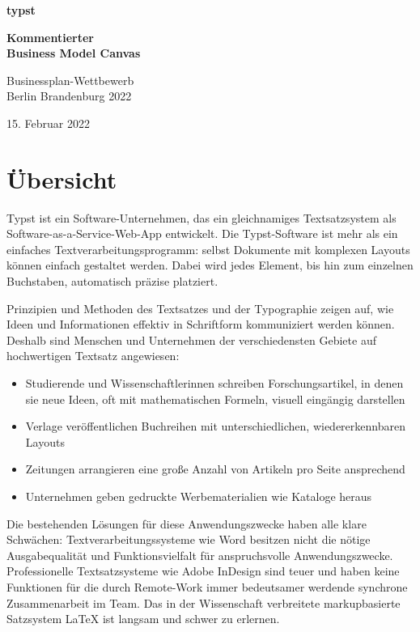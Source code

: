 \documentclass[11pt, a4paper]{article}
\newcommand{\gender}{\raisebox{-.25em}{*}}
\let\oldsection\section
\renewcommand\section{\clearpage\oldsection}
\renewcommand{\glossary} {\marginsymbol{\textbf{↪}}}
\newcommand{\marginsymbol}[1] {\protect\marginsymbolhelper{#1}}
\newcommand{\marginsymbolhelper}[1] {\tabto*{-1cm}\makebox[0cm]{#1}\tabto*{\TabPrevPos}}
\begin{document}
\raggedright
\pagecolor{eastern}
\mbox{}
\vfill
{
\color{white}
\LARGE
\textbf{\Buenard\fontsize{50}{60}\selectfont typst}
\vspace{1cm}

\textbf{Kommentierter \\ Business Model Canvas}

{
\Large
Businessplan-Wettbewerb \\
Berlin Brandenburg 2022 

15. Februar 2022
}
\vspace{2.25cm}
}
\section*{Übersicht}
\pagecolor{white}
\NoBgThispage
\vspace{2mm}

Typst ist ein Software-Unternehmen, das ein gleichnamiges Textsatzsystem als Software-as-a-Service-Web-App entwickelt. Die Typst-Software ist mehr als ein einfaches Textverarbeitungsprogramm: selbst Dokumente mit komplexen Layouts können einfach gestaltet werden. Dabei wird jedes Element, bis hin zum einzelnen Buchstaben, automatisch präzise platziert.

Prinzipien und Methoden des Textsatzes und der Typographie zeigen auf, wie Ideen und Informationen effektiv in Schriftform kommuniziert werden können. Deshalb sind Menschen und Unternehmen der verschiedensten Gebiete auf hochwertigen Textsatz angewiesen:
\begin{itemize}
    \item Studierende und Wissenschaftler\gender{}innen schreiben Forschungsartikel, in denen sie neue Ideen, oft mit mathematischen Formeln, visuell eingängig darstellen
    \item Verlage veröffentlichen Buchreihen mit unterschiedlichen, wiedererkennbaren Layouts
    \item Zeitungen arrangieren eine große Anzahl von Artikeln pro Seite ansprechend
    \item Unternehmen geben gedruckte Werbematerialien wie Kataloge heraus
\end{itemize}

Die bestehenden Lösungen für diese Anwendungszwecke haben alle klare Schwächen: Textverarbeitungssysteme wie Word besitzen nicht die nötige Ausgabequalität und Funktionsvielfalt für anspruchsvolle Anwendungszwecke. Professionelle Textsatzsysteme wie Adobe InDesign sind teuer und haben keine Funktionen für die durch Remote-Work immer bedeutsamer werdende synchrone Zusammenarbeit im Team. Das in der Wissenschaft verbreitete \glossary markupbasierte Satzsystem LaTeX ist langsam und schwer zu erlernen.
\end{document}

